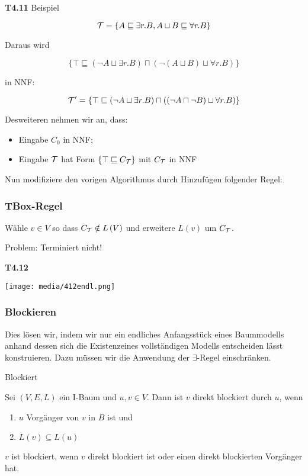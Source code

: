 \textbf{T4.11} Beispiel

$$\mathcal{T} = \{A \sqsubseteq \exists r.B, A \sqcup B \sqsubseteq \forall r.B\}$$

Daraus wird

$$\{\top \sqsubseteq (\neg A \sqcup \exists r.B) \sqcap (\neg (A \sqcup B) \sqcup \forall r.B)\}$$

in NNF:

$$\mathcal{T}' = \{\top \sqsubseteq (\neg A \sqcup \exists r.B) \sqcap ((\neg A \sqcap \neg B) \sqcup \forall r.B)\}$$

Desweiteren nehmen wir an, dass:

\begin{itemize}
	\item Eingabe $C_0$ in NNF;
	\item Eingabe $\mathcal{T}$ hat Form $\{\top \sqsubseteq C_{\mathcal{T}}\}$ mit $C_{\mathcal{T}}$ in NNF
\end{itemize}

Nun modifiziere den vorigen Algorithmus durch Hinzufügen folgender Regel:

\subsubsection{TBox-Regel}\label{tbox-regel}

Wähle $v \in V$ so dass $C_{\mathcal{T}} \notin L\left( V \right)$ und
erweitere $L\left( v \right)$ um $C_{\mathcal{T}}$.

Problem: Terminiert nicht!

\textbf{T4.12}

\texttt{[image: media/412endl.png]}

\subsubsection{Blockieren}\label{blockieren}

Dies lösen wir, indem wir nur ein endliches Anfangsstück eines Baummodells anhand dessen sich die Existenzeines vollständigen Modells entscheiden lässt konstruieren. Dazu müssen wir die Anwendung der $\exists$-Regel einschränken.

\begin{definition}{Blockiert}

Sei $\left( V,E,L \right)$ ein I-Baum und $u,v \in V$. Dann ist
$v$ direkt blockiert durch $u$, wenn

\begin{enumerate}
\def\labelenumi{\arabic{enumi}.}
\item
  $u$ Vorgänger von $v$ in $B$ ist und
\item
  $L\left( v \right) \subseteq L\left( u \right)$
\end{enumerate}

$v$ ist blockiert, wenn $v$ direkt blockiert ist oder einen direkt
blockierten Vorgänger hat.
\end{definition}

